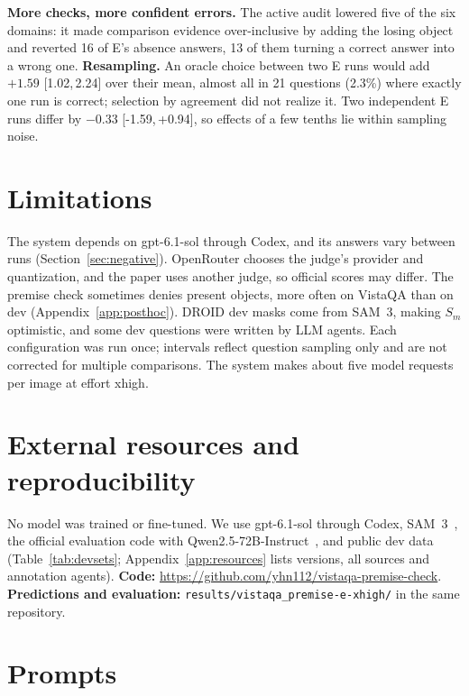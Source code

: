 \documentclass{article}
\newcommand{\ci}[2]{[#1,\,#2]}
\newcommand{\repourl}{https://github.com/yhn112/vistaqa-premise-check}
\begin{document}
\textbf{More checks, more confident errors.}
The active audit lowered five of the six domains:
it made comparison evidence over-inclusive by adding the losing object
and reverted 16 of E's absence answers, 13 of them turning a correct answer into a wrong one.
\textbf{Resampling.}
An oracle choice between two E runs would add $+1.59$ \ci{1.02}{2.24} over their mean,
almost all in 21 questions (2.3\%) where exactly one run is correct; selection by agreement did not realize it.
Two independent E runs differ by $-0.33$ \ci{-1.59}{+0.94}, so effects of a few tenths lie within sampling noise.

\section{Limitations}

The system depends on gpt-6.1-sol through Codex, and its answers vary between runs (Section~\ref{sec:negative}).
OpenRouter chooses the judge's provider and quantization, and the paper uses another judge, so official scores may differ.
The premise check sometimes denies present objects, more often on VistaQA than on dev (Appendix~\ref{app:posthoc}).
DROID dev masks come from SAM~3, making $S_m$ optimistic, and some dev questions were written by LLM agents.
Each configuration was run once; intervals reflect question sampling only and are not corrected for multiple comparisons.
The system makes about five model requests per image at effort xhigh.

\section{External resources and reproducibility}
\label{sec:resources}

No model was trained or fine-tuned.
We use gpt-6.1-sol through Codex, SAM~3~\citep{sam3}, the official evaluation code with Qwen2.5-72B-Instruct~\citep{qwen25},
and public dev data (Table~\ref{tab:devsets}; Appendix~\ref{app:resources} lists versions, all sources and annotation agents).
\textbf{Code:} \url{\repourl}.
\textbf{Predictions and evaluation:} \texttt{results/vistaqa\_premise-e-xhigh/} in the same repository.




\appendix

\section{Prompts}
\label{app:prompts}
\end{document}
